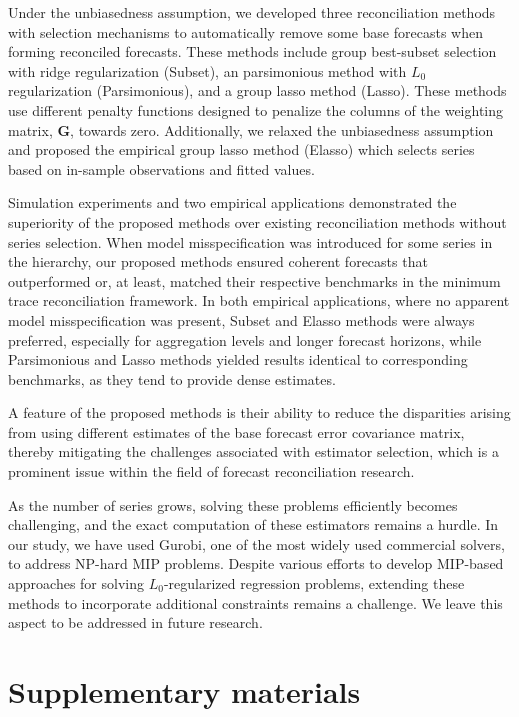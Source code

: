 \documentclass[
  11pt]{article}
\theoremstyle{plain}
\theoremstyle{remark}
\begin{document}
Under the unbiasedness assumption, we developed three reconciliation
methods with selection mechanisms to automatically remove some base
forecasts when forming reconciled forecasts. These methods include group
best-subset selection with ridge regularization (Subset), an
parsimonious method with \(L_0\) regularization (Parsimonious), and a
group lasso method (Lasso). These methods use different penalty
functions designed to penalize the columns of the weighting matrix,
\(\bm{G}\), towards zero. Additionally, we relaxed the unbiasedness
assumption and proposed the empirical group lasso method (Elasso) which
selects series based on in-sample observations and fitted values.

Simulation experiments and two empirical applications demonstrated the
superiority of the proposed methods over existing reconciliation methods
without series selection. When model misspecification was introduced for
some series in the hierarchy, our proposed methods ensured coherent
forecasts that outperformed or, at least, matched their respective
benchmarks in the minimum trace reconciliation framework. In both
empirical applications, where no apparent model misspecification was
present, Subset and Elasso methods were always preferred, especially for
aggregation levels and longer forecast horizons, while Parsimonious and
Lasso methods yielded results identical to corresponding benchmarks, as
they tend to provide dense estimates.

A feature of the proposed methods is their ability to reduce the
disparities arising from using different estimates of the base forecast
error covariance matrix, thereby mitigating the challenges associated
with estimator selection, which is a prominent issue within the field of
forecast reconciliation research.

As the number of series grows, solving these problems efficiently
becomes challenging, and the exact computation of these estimators
remains a hurdle. In our study, we have used Gurobi, one of the most
widely used commercial solvers, to address NP-hard MIP problems. Despite
various efforts to develop MIP-based approaches for solving
\(L_0\)-regularized regression problems, extending these methods to
incorporate additional constraints remains a challenge. We leave this
aspect to be addressed in future research.

\section*{Supplementary materials}\label{supplementary-materials}
\end{document}

